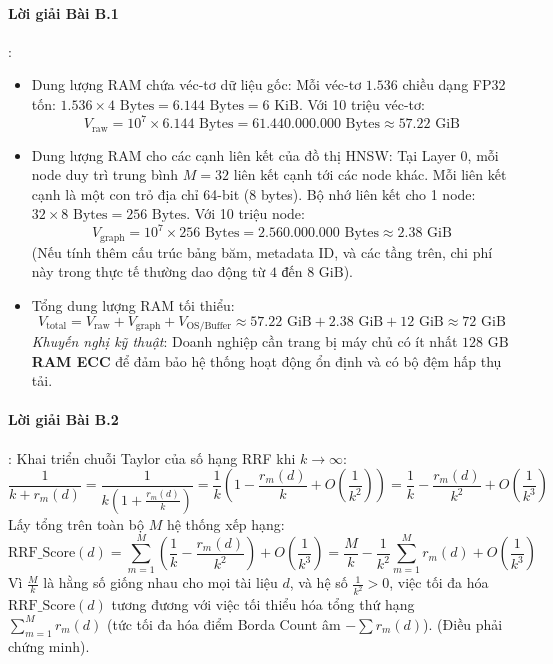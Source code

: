 \paragraph{Lời giải Bài B.1}:
\begin{itemize}
  \item[a)] Dung lượng RAM chứa véc-tơ dữ liệu gốc:
  Mỗi véc-tơ $1.536$ chiều dạng FP32 tốn: $1.536 \times 4\text{ Bytes} = 6.144\text{ Bytes} = 6\text{ KiB}$.
  Với 10 triệu véc-tơ:
  \begin{equation*}
  V_{\text{raw}} = 10^7 \times 6.144\text{ Bytes} = 61.440.000.000\text{ Bytes} \approx 57.22\text{ GiB}
  \end{equation*}

  \item[b)] Dung lượng RAM cho các cạnh liên kết của đồ thị HNSW:
  Tại Layer 0, mỗi node duy trì trung bình $M = 32$ liên kết cạnh tới các node khác.
  Mỗi liên kết cạnh là một con trỏ địa chỉ 64-bit ($8$ bytes).
  Bộ nhớ liên kết cho 1 node: $32 \times 8\text{ Bytes} = 256\text{ Bytes}$.
  Với 10 triệu node:
  \begin{equation*}
  V_{\text{graph}} = 10^7 \times 256\text{ Bytes} = 2.560.000.000\text{ Bytes} \approx 2.38\text{ GiB}
  \end{equation*}
  (Nếu tính thêm cấu trúc bảng băm, metadata ID, và các tầng trên, chi phí này trong thực tế thường dao động từ $4\text{ đến }8\text{ GiB}$).

  \item[c)] Tổng dung lượng RAM tối thiểu:
  \begin{equation*}
  V_{\text{total}} = V_{\text{raw}} + V_{\text{graph}} + V_{\text{OS/Buffer}} \approx 57.22\text{ GiB} + 2.38\text{ GiB} + 12\text{ GiB} \approx 72\text{ GiB}
  \end{equation*}
  \textit{Khuyến nghị kỹ thuật}: Doanh nghiệp cần trang bị máy chủ có ít nhất \textbf{$128\text{ GB}$ RAM ECC} để đảm bảo hệ thống hoạt động ổn định và có bộ đệm hấp thụ tải.
\end{itemize}

\paragraph{Lời giải Bài B.2}:
Khai triển chuỗi Taylor của số hạng RRF khi $k \to \infty$:
\begin{equation*}
\frac{1}{k + r_m(d)} = \frac{1}{k \left(1 + \frac{r_m(d)}{k}\right)} = \frac{1}{k} \left( 1 - \frac{r_m(d)}{k} + O\left(\frac{1}{k^2}\right) \right) = \frac{1}{k} - \frac{r_m(d)}{k^2} + O\left(\frac{1}{k^3}\right)
\end{equation*}
Lấy tổng trên toàn bộ $M$ hệ thống xếp hạng:
\begin{equation*}
\text{RRF\_Score}(d) = \sum_{m=1}^M \left( \frac{1}{k} - \frac{r_m(d)}{k^2} \right) + O\left(\frac{1}{k^3}\right) = \frac{M}{k} - \frac{1}{k^2} \sum_{m=1}^M r_m(d) + O\left(\frac{1}{k^3}\right)
\end{equation*}
Vì $\frac{M}{k}$ là hằng số giống nhau cho mọi tài liệu $d$, và hệ số $\frac{1}{k^2} > 0$, việc tối đa hóa $\text{RRF\_Score}(d)$ tương đương với việc tối thiểu hóa tổng thứ hạng $\sum_{m=1}^M r_m(d)$ (tức tối đa hóa điểm Borda Count âm $-\sum r_m(d)$). (Điều phải chứng minh).


